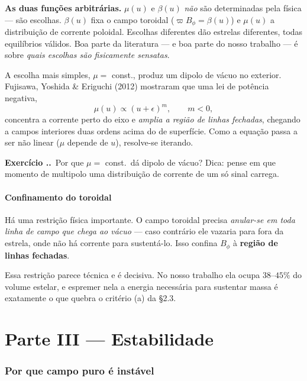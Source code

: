\documentclass[11pt,a4paper]{article}
\newcounter{exerc}[section]
\newcommand{\ex}[1]{\refstepcounter{exerc}%
  \medskip\noindent\textbf{Exercício \thesection.\theexerc.}\ #1\medskip}
\begin{document}
\begin{alerta}
\textbf{As duas funções arbitrárias.} $\mu(u)$ e $\beta(u)$ \emph{não} são
determinadas pela física --- são escolhas. $\beta(u)$ fixa o campo toroidal
($\varpi B_\phi = \beta(u)$) e $\mu(u)$ a distribuição de corrente poloidal.
Escolhas diferentes dão estrelas diferentes, todas equilíbrios válidos. Boa
parte da literatura --- e boa parte do nosso trabalho --- é sobre \emph{quais
escolhas são fisicamente sensatas}.
\end{alerta}

A escolha mais simples, $\mu = $ const., produz um dipolo de vácuo no exterior.
Fujisawa, Yoshida \& Eriguchi (2012) mostraram que uma lei de potência
negativa,
\begin{equation}
\mu(u) \propto (u+\epsilon)^{m}, \qquad m < 0,
\end{equation}
concentra a corrente perto do eixo e \emph{amplia a região de linhas fechadas},
chegando a campos interiores duas ordens acima do de superfície. Como a equação
passa a ser não linear ($\mu$ depende de $u$), resolve-se iterando.

\ex{Por que $\mu = $ const.\ dá dipolo de vácuo? Dica: pense em que momento de
multipolo uma distribuição de corrente de um só sinal carrega.}

\subsection{Confinamento do toroidal}

Há uma restrição física importante. O campo toroidal precisa \emph{anular-se em
toda linha de campo que chega ao vácuo} --- caso contrário ele vazaria para
fora da estrela, onde não há corrente para sustentá-lo. Isso confina $B_\phi$ à
\textbf{região de linhas fechadas}.

Essa restrição parece técnica e é decisiva. No nosso trabalho ela ocupa
$38$--$45\%$ do volume estelar, e espremer nela a energia necessária para
sustentar massa é exatamente o que quebra o critério (a) da §2.3.

\part*{Parte III --- Estabilidade}

\section{Por que campo puro é instável}
\end{document}
